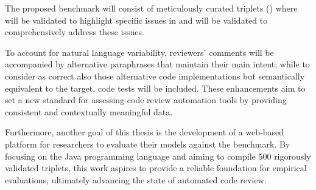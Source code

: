 The proposed benchmark will consist of meticulously curated triplets (\subCode)
where \revComment will be validated to highlight specific issues in \subCode and
\revCode will be validated to comprehensively address these issues. 

To account for natural language variability, reviewers' comments will be accompanied by 
alternative paraphrases that maintain their main intent; while to consider as correct also 
those alternative code implementations but semantically equivalent to the target, code tests will 
be included. These enhancements aim to set a new standard for assessing code review 
automation tools by providing consistent and contextually meaningful data.

Furthermore, another goal of this thesis is the development of a web-based platform for researchers to
evaluate their models against the benchmark. By focusing on the Java
programming language and aiming to compile 500 rigorously validated triplets,
this work aspires to provide a reliable foundation for empirical evaluations,
ultimately advancing the state of automated code review.
